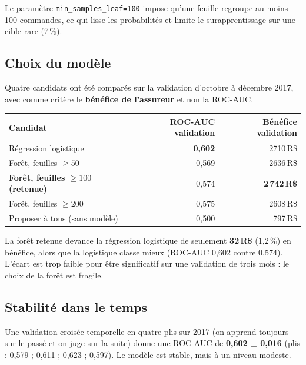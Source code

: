 \documentclass[11pt,a4paper]{article}
\newcommand{\RS}{\,R\$}
\newcommand{\var}[1]{\texttt{#1}}
\begin{document}
Le paramètre \var{min\_samples\_leaf=100} impose qu'une feuille regroupe au moins 100 commandes,
ce qui lisse les probabilités et limite le surapprentissage sur une cible rare (7\,\%).

\subsection{Choix du modèle}

Quatre candidats ont été comparés sur la validation d'octobre à décembre 2017, avec comme
critère le \textbf{bénéfice de l'assureur} et non la ROC-AUC.

\begin{center}
\begin{tabular}{@{}lrr@{}}
\toprule
Candidat & ROC-AUC validation & Bénéfice validation \\
\midrule
Régression logistique & \textbf{0,602} & \num{2710}\RS{} \\
Forêt, feuilles $\geq 50$ & 0,569 & \num{2636}\RS{} \\
\textbf{Forêt, feuilles $\geq 100$ (retenue)} & 0,574 & \textbf{2\,742\RS} \\
Forêt, feuilles $\geq 200$ & 0,575 & \num{2608}\RS{} \\
Proposer à tous (sans modèle) & 0,500 & \num{797}\RS{} \\
\bottomrule
\end{tabular}
\end{center}

\begin{encadre}[colframe=prudence, title=Point d'attention]
La forêt retenue devance la régression logistique de seulement \textbf{32\RS} (1,2\,\%) en
bénéfice, alors que la logistique classe mieux (ROC-AUC 0,602 contre 0,574). L'écart est trop
faible pour être significatif sur une validation de trois mois : le choix de la forêt est
fragile.
\end{encadre}

\subsection{Stabilité dans le temps}

Une validation croisée temporelle en quatre plis sur 2017 (on apprend toujours sur le passé et
on juge sur la suite) donne une ROC-AUC de \textbf{0,602 $\pm$ 0,016}
(plis : 0,579 ; 0,611 ; 0,623 ; 0,597). Le modèle est stable, mais à un niveau modeste.

\end{document}
